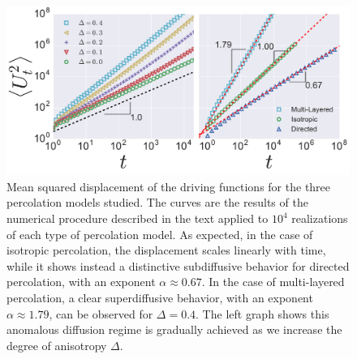 \begin{figure}
\begin{center}
    \includegraphics[width=\textwidth]{chapters/ch6-asle/figs/diffusion}
\end{center}
\caption{Mean squared displacement of the driving functions for the three
    percolation models studied. The curves are the results of the numerical
    procedure described in the text applied to $10^4$ realizations of each type
    of percolation model. As expected, in the case of isotropic percolation,
    the displacement scales linearly with time, while it shows instead a
    distinctive subdiffusive behavior for directed percolation, with an
    exponent $\alpha\approx0.67$. In the case of multi-layered percolation, a
    clear superdiffusive behavior, with an exponent $\alpha\approx1.79$, can be
    observed for $\Delta=0.4$. The left graph shows this anomalous diffusion
    regime is gradually achieved as we increase the degree of anisotropy
    $\Delta$.}
\label{fig:diffusion}
\end{figure}

